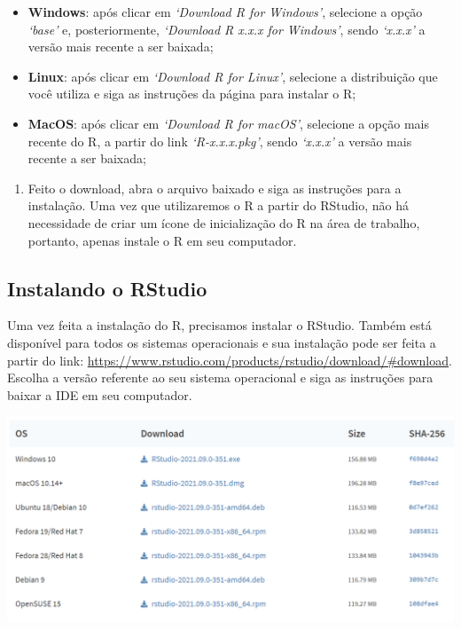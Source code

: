 \documentclass[
  brazilian,
]{book}
\providecommand{\tightlist}{%
  \setlength{\itemsep}{0pt}\setlength{\parskip}{0pt}}
\let\origfigure\figure
\let\endorigfigure\endfigure
\renewenvironment{figure}[1][2] {
    \expandafter\origfigure\expandafter[H]
} {
    \endorigfigure
}
\begin{document}
\begin{itemize}
\item
  \textbf{Windows}: após clicar em \emph{`Download R for Windows'}, selecione a opção \emph{`base'} e, posteriormente, \emph{`Download R x.x.x for Windows'}, sendo \emph{`x.x.x'} a versão mais recente a ser baixada;
\item
  \textbf{Linux}: após clicar em \emph{`Download R for Linux'}, selecione a distribuição que você utiliza e siga as instruções da página para instalar o R;
\item
  \textbf{MacOS}: após clicar em \emph{`Download R for macOS'}, selecione a opção mais recente do R, a partir do link \emph{`R-x.x.x.pkg'}, sendo \emph{`x.x.x'} a versão mais recente a ser baixada;
\end{itemize}

\begin{enumerate}
\def\labelenumi{\arabic{enumi}.}
\setcounter{enumi}{5}
\tightlist
\item
  Feito o download, abra o arquivo baixado e siga as instruções para a instalação. Uma vez que utilizaremos o R a partir do RStudio, não há necessidade de criar um ícone de inicialização do R na área de trabalho, portanto, apenas instale o R em seu computador.
\end{enumerate}

\hypertarget{instalando-o-rstudio}{%
\subsection{Instalando o RStudio}\label{instalando-o-rstudio}}

Uma vez feita a instalação do R, precisamos instalar o RStudio. Também está disponível para todos os sistemas operacionais e sua instalação pode ser feita a partir do link: \url{https://www.rstudio.com/products/rstudio/download/\#download}. Escolha a versão referente ao seu sistema operacional e siga as instruções para baixar a IDE em seu computador.

\begin{figure}

{\centering \includegraphics[width=0.8\linewidth]{imagens/rstudio_download} 

}

\caption{Na página referente ao link acima, vá até a seção ilustrada na figura. Lá encontraremos as versões disponíveis do RStudio, de acordo com o sistema operacional.}\label{fig:unnamed-chunk-2}
\end{figure}
\end{document}
